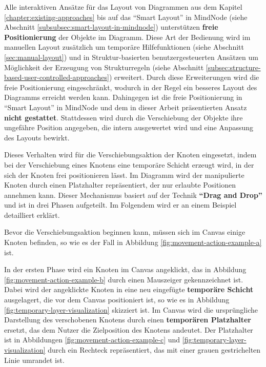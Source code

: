 Alle interaktiven Ansätze für das Layout von Diagrammen aus dem Kapitel \ref{chapter:existing-approaches} bis auf das \enquote{Smart Layout} in MindNode (siehe Abschnitt \ref{subsubsec:smart-layout-in-mindnode}) unterstützen \textbf{freie Positionierung} der Objekte im Diagramm. Diese Art der Bedienung wird im manuellen Layout zusätzlich um temporäre Hilfefunktionen (siehe Abschnitt \ref{sec:manual-layout}) und in Struktur-basierten benutzergesteuerten Ansätzen um Möglichkeit der Erzeugung von Strukturregeln (siehe Abschnitt \ref{subsec:structure-based-user-controlled-approaches}) erweitert. Durch diese Erweiterungen wird die freie Positionierung eingeschränkt, wodurch in der Regel ein besseres Layout des Diagramms erreicht werden kann. Dahingegen ist die freie Positionierung in \enquote{Smart Layout} in MindNode und dem in dieser Arbeit präsentierten Ansatz \textbf{nicht gestattet}. Stattdessen wird durch die Verschiebung der Objekte ihre ungefähre Position angegeben, die intern ausgewertet wird und eine Anpassung des Layouts bewirkt.

Dieses Verhalten wird für die Verschiebungsaktion der Knoten eingesetzt, indem bei der Verschiebung eines Knotens eine temporäre Schicht erzeugt wird, in der sich der Knoten frei positionieren lässt. Im Diagramm wird der manipulierte Knoten durch einen Platzhalter repräsentiert, der nur erlaubte Positionen annehmen kann. Dieser Mechanismus basiert auf der Technik \textbf{\enquote{Drag and Drop}} und ist in drei Phasen aufgeteilt. Im Folgendem wird er an einem Beispiel detailliert erklärt.

Bevor die Verschiebungsaktion beginnen kann, müssen sich im Canvas einige Knoten befinden, so wie es der Fall in Abbildung \ref{fig:movement-action-example-a} ist.

In der ersten Phase wird ein Knoten im Canvas angeklickt, das in Abbildung \ref{fig:movement-action-example-b} durch einen Mauszeiger gekennzeichnet ist. Dabei wird der angeklickte Knoten in eine neu eingefügte \textbf{temporäre Schicht} ausgelagert, die vor dem Canvas positioniert ist, so wie es in Abbildung \ref{fig:temporary-layer-visualization} skizziert ist. Im Canvas wird die ursprüngliche Darstellung des verschobenen Knotens durch einen \textbf{temporären Platzhalter} ersetzt, das dem Nutzer die Zielposition des Knotens andeutet. Der Platzhalter ist in Abbildungen \ref{fig:movement-action-example-c} und \ref{fig:temporary-layer-visualization} durch ein Rechteck repräsentiert, das mit einer grauen gestrichelten Linie umrandet ist.

